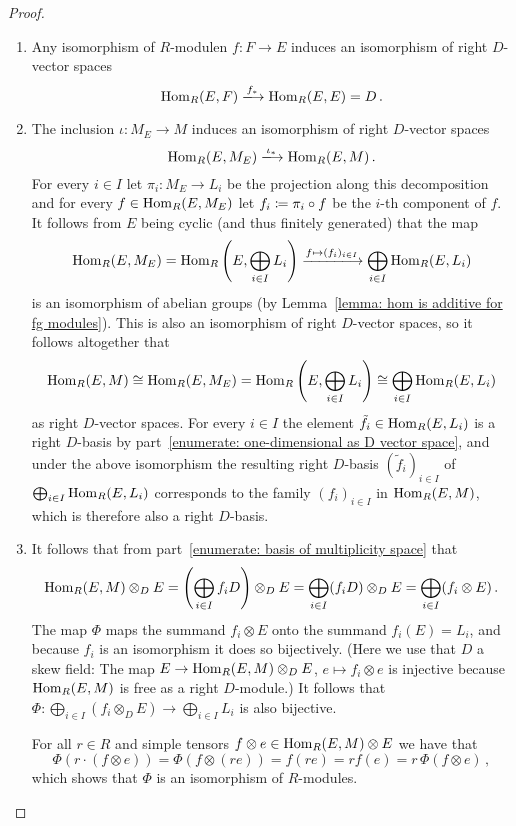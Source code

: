 \begin{proof}
  \leavevmode
  \begin{enumerate}
    \item
      Any isomorphism of $R$-modulen $f \colon F \to E$ induces an isomorphism of right $D$-vector spaces
      \[
                              \Hom_R(E,F)
        \xlongrightarrow{f_*} \Hom_R(E,E)
        =                     D \,.
      \]
    \item
      The inclusion $\iota \colon M_E \to M$ induces an isomorphism of right $D$-vector spaces
      \[
                                  \Hom_R(E, M_E)
        \xlongrightarrow{\iota_*} \Hom_R(E, M) \,.
      \]
      For every $i \in I$ let $\pi_i \colon M_E \to L_i$ be the projection along this decomposition and for every $f \in \operatorname{Hom}_R(E,M_E)$ let $f_i \coloneqq \pi_i \circ f$ be the $i$-th component of $f$.
      It follows from $E$ being cyclic (and thus finitely generated) that the map
      \[
              \Hom_R(E, M_E)
        =     \Hom_R\left(E, \bigoplus_{i \in I} L_i \right)
        \xlongrightarrow{f \mapsto (f_i)_{i \in I}}
              \bigoplus_{i \in I} \Hom_R(E, L_i)
      \]
      is an isomorphism of abelian groups (by Lemma~\ref{lemma: hom is additive for fg modules}).
      This is also an isomorphism of right $D$-vector spaces, so it follows altogether that
      \[
              \operatorname{Hom}_R(E, M)
        \cong \operatorname{Hom}_R(E, M_E)
        =     \operatorname{Hom}_R\left( E, \bigoplus_{i \in I} L_i \right)
        \cong \bigoplus_{i \in I} \operatorname{Hom}_R(E, L_i)
      \]
      as right $D$-vector spaces.
      For every $i \in I$ the element $\tilde{f}_i \in \operatorname{Hom}_R(E, L_i)$ is a right $D$-basis by part~\ref*{enumerate: one-dimensional as D vector space}, and under the above isomorphism the resulting right $D$-basis $(\tilde{f}_i)_{i \in I}$ of $\bigoplus_{i \in I} \operatorname{Hom}_R(E, L_i)$ corresponds to the family $(f_i)_{i \in I}$ in $\operatorname{Hom}_R(E,M)$, which is therefore also a right $D$-basis.
    \item
      It follows that from part~\ref*{enumerate: basis of multiplicity space} that
      \[
          \operatorname{Hom}_R(E, M) \otimes_D E
        = \left( \bigoplus_{i \in I} f_i D \right) \otimes_D E
        = \bigoplus_{i \in I} (f_i D) \otimes_D E
        = \bigoplus_{i \in I} (f_i \otimes E) \,.
      \]
      The map $\Phi$ maps the summand $f_i \otimes E$ onto the summand $f_i(E) = L_i$, and because $f_i$ is an isomorphism it does so bijectively.
      (Here we use that $D$ a skew field:
      The map $E \to \operatorname{Hom}_R(E, M) \otimes_D E$, $e \mapsto f_i \otimes e$ is injective because $\operatorname{Hom}_R(E,M)$ is free as a right $D$-module.)
      It follows that $\Phi \colon \bigoplus_{i \in I} (f_i \otimes_D E) \to \bigoplus_{i \in I} L_i$ is also bijective.
      
      For all $r \in R$ and simple tensors $f \otimes e \in \operatorname{Hom}_R(E,M) \otimes E$ we have that
      \[
          \Phi(r \cdot (f \otimes e))
        = \Phi(f \otimes (re))
        = f(re)
        = r f(e)
        = r \, \Phi(f \otimes e) \,,
      \]
      which shows that $\Phi$ is an isomorphism of $R$-modules.
    \qedhere
  \end{enumerate}
\end{proof}


